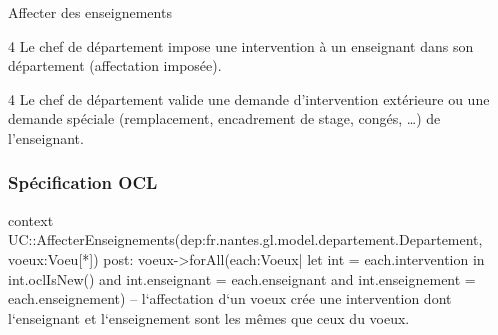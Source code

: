 \begin{usecase}{Affecter des enseignements}
 \begin{variation}
 \item [4] Le chef de département impose une intervention à un enseignant dans son département (affectation imposée).
 \item [4] Le chef de département valide une demande d'intervention extérieure ou une demande spéciale (remplacement, encadrement de stage, congés, \dots) de l'enseignant.
 \end{variation}
\end{usecase}

\subsubsection{Spécification OCL}
\begin{ocl}
context UC::AffecterEnseignements(dep:fr.nantes.gl.model.departement.Departement, voeux:Voeu[*])
post:
voeux->forAll(each:Voeux| let int = each.intervention in
	int.oclIsNew() and int.enseignant = each.enseignant and
	int.enseignement = each.enseignement)
	-- l`affectation d`un voeux crée une intervention dont l`enseignant et l`enseignement sont les mêmes que ceux du voeux.
 \end{ocl}

